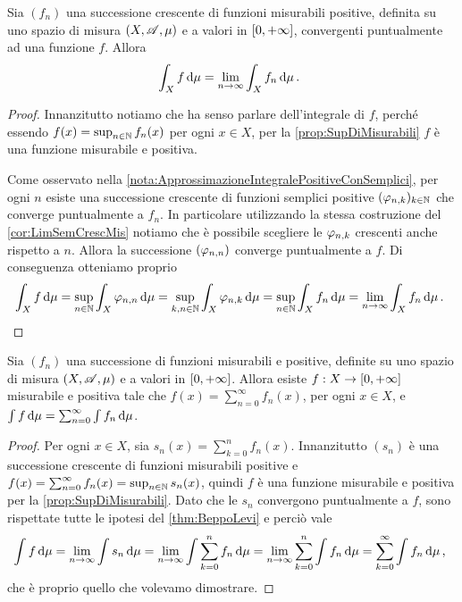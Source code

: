 \begin{theorem}\label{thm:BeppoLevi}
	Sia $(f_n)$ una successione crescente di funzioni misurabili positive, definita su uno spazio di misura $(X,\mathscr A,\mu)$ e a valori in $[0,+\infty]$, convergenti puntualmente ad una funzione $f$. Allora 
	\begin{equation*}
	\int_Xf\,\mathrm d\mu=\lim_{n\to\infty}\int_Xf_n\,\mathrm d\mu\, \text{. }
	\end{equation*}
\end{theorem}

\begin{proof}
	Innanzitutto notiamo che ha senso parlare dell'integrale di $f$, perché essendo $f(x)=\sup_{n\in\mathbb N}f_n(x)$ per ogni $x\in X$, per la \cref{prop:SupDiMisurabili} $f$ è una funzione misurabile e positiva.
	
	Come osservato nella \cref{nota:ApprossimazioneIntegralePositiveConSemplici}, per ogni $n$ esiste una successione crescente di funzioni semplici positive $(\varphi_{n,k})_{k\in\mathbb N}$ che converge puntualmente a $f_n$. In particolare utilizzando la stessa costruzione del \cref{cor:LimSemCrescMis} notiamo che è possibile scegliere le $\varphi_{n,k}$ crescenti anche rispetto a $n$. Allora la successione $(\varphi_{n,n})$ converge puntualmente a $f$. Di conseguenza otteniamo proprio
	\begin{equation*}
		\int_X f\,\mathrm d\mu=\sup_{n\in\mathbb N}\int_X\varphi_{n,n}\,\mathrm d\mu=\sup_{k,n\in\mathbb N}\int_X \varphi_{n,k}\,\mathrm d\mu=\sup_{n\in\mathbb N}\int_X f_n\,\mathrm d\mu=\lim_{n\to\infty}\int_Xf_n\,\mathrm d\mu\, \text{. }
	\end{equation*}
\end{proof}

\begin{corollary}\label{cor:IntegrazionePerSeriePositive}
	Sia $(f_n)$ una successione di funzioni misurabili e positive, definite su uno spazio di misura $(X,\mathscr A,\mu)$ e a valori in $[0,+\infty]$. Allora esiste $f:X\to[0,+\infty]$ misurabile e positiva tale che $f(x)=\sum_{n=0}^\infty f_n(x)$, per ogni $x\in X$, e $\int f\,\mathrm d\mu=\sum_{n=0}^\infty\int f_n\,\mathrm d\mu$.
\end{corollary}

\begin{proof}
	Per ogni $x\in X$, sia $s_n(x)=\sum_{k=0}^nf_n(x)$. Innanzitutto $(s_n)$ è una successione crescente di funzioni misurabili positive e $f(x)=\sum_{n=0}^\infty f_n(x)=\sup_{n\in\mathbb N}s_n(x)$, quindi $f$ è una funzione misurabile e positiva per la \cref{prop:SupDiMisurabili}. Dato che le $s_n$ convergono puntualmente a $f$, sono rispettate tutte le ipotesi del \cref{thm:BeppoLevi} e perciò vale
	\begin{equation*}
		\int f \,\mathrm d\mu=\lim_{n\to\infty}\int s_n\,\mathrm d\mu=\lim_{n\to\infty}\int \sum_{k=0}^nf_n\,\mathrm d\mu=\lim_{n\to\infty}\sum_{k=0}^n \int f_n\,\mathrm d\mu=\sum_{k=0}^\infty\int f_n\,\mathrm d\mu\, \text{, }
	\end{equation*}
	che è proprio quello che volevamo dimostrare.
\end{proof}

